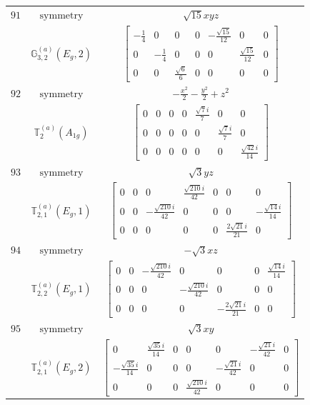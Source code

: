 \documentclass[fleqn,8pt,landscape]{jsarticle}
\begin{document}
\begin{longtable}{ccc}
$ 91 $ & $ \text{symmetry} $ & $ \sqrt{15} x y z $ \\
$  $ & $ \mathbb{G}_{3,2}^{(a)}(E_{g},2) $ & $ \begin{bmatrix} - \frac{1}{4} & 0 & 0 & 0 & - \frac{\sqrt{15}}{12} & 0 & 0 \\ 0 & - \frac{1}{4} & 0 & 0 & 0 & \frac{\sqrt{15}}{12} & 0 \\ 0 & 0 & \frac{\sqrt{6}}{6} & 0 & 0 & 0 & 0 \end{bmatrix} $ \\ \hline
$ 92 $ & $ \text{symmetry} $ & $ - \frac{x^{2}}{2} - \frac{y^{2}}{2} + z^{2} $ \\
$  $ & $ \mathbb{T}_{2}^{(a)}(A_{1g}) $ & $ \begin{bmatrix} 0 & 0 & 0 & 0 & \frac{\sqrt{7} i}{7} & 0 & 0 \\ 0 & 0 & 0 & 0 & 0 & \frac{\sqrt{7} i}{7} & 0 \\ 0 & 0 & 0 & 0 & 0 & 0 & \frac{\sqrt{42} i}{14} \end{bmatrix} $ \\ \hline
$ 93 $ & $ \text{symmetry} $ & $ \sqrt{3} y z $ \\
$  $ & $ \mathbb{T}_{2,1}^{(a)}(E_{g},1) $ & $ \begin{bmatrix} 0 & 0 & 0 & \frac{\sqrt{210} i}{42} & 0 & 0 & 0 \\ 0 & 0 & - \frac{\sqrt{210} i}{42} & 0 & 0 & 0 & - \frac{\sqrt{14} i}{14} \\ 0 & 0 & 0 & 0 & 0 & \frac{2 \sqrt{21} i}{21} & 0 \end{bmatrix} $ \\ \hline
$ 94 $ & $ \text{symmetry} $ & $ - \sqrt{3} x z $ \\
$  $ & $ \mathbb{T}_{2,2}^{(a)}(E_{g},1) $ & $ \begin{bmatrix} 0 & 0 & - \frac{\sqrt{210} i}{42} & 0 & 0 & 0 & \frac{\sqrt{14} i}{14} \\ 0 & 0 & 0 & - \frac{\sqrt{210} i}{42} & 0 & 0 & 0 \\ 0 & 0 & 0 & 0 & - \frac{2 \sqrt{21} i}{21} & 0 & 0 \end{bmatrix} $ \\ \hline
$ 95 $ & $ \text{symmetry} $ & $ \sqrt{3} x y $ \\
$  $ & $ \mathbb{T}_{2,1}^{(a)}(E_{g},2) $ & $ \begin{bmatrix} 0 & \frac{\sqrt{35} i}{14} & 0 & 0 & 0 & - \frac{\sqrt{21} i}{42} & 0 \\ - \frac{\sqrt{35} i}{14} & 0 & 0 & 0 & - \frac{\sqrt{21} i}{42} & 0 & 0 \\ 0 & 0 & 0 & \frac{\sqrt{210} i}{42} & 0 & 0 & 0 \end{bmatrix} $ \\ \hline

\end{longtable}
\end{document}
